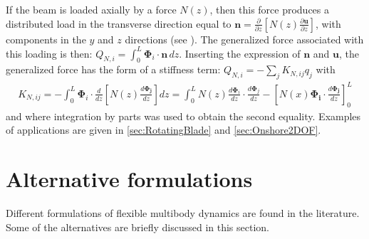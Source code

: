\documentclass[wes, manuscript]{copernicus}
\renewcommand{\v}[1]{\boldsymbol{#1}}
\begin{document}
If the beam is loaded axially by a force $N(z)$, then this force produces a distributed load in the transverse direction equal to $\v{n} = \frac{\partial}{\partial z}\left[N(z)\frac{\partial \v{u}}{\partial z}\right]$, with components in the $y$ and $z$ directions (see \cite{branlard:2019flex}).
The generalized force associated with this loading is then: $Q_{N,i}=\int_0^L \v{\Phi}_i\cdot \v{n}\, dz$. Inserting the expression of $\v{n}$ and $\v{u}$, the generalized force has the form of a stiffness term: $Q_{N,i} =-\sum_j K_{N,ij} q_j$ with
\begin{align}
   K_{N,ij} = -\int_0^L \v{\Phi}_i \cdot \frac{d}{d z} \left[N(z) \frac{d \v{\Phi_j}}{d z}\right] dz  
       = \int_0^L N(z) \frac{d \v{\Phi}_i }{dz}\cdot \frac{d \v{\Phi}_j }{dz} - \left[N(x) \v{\Phi_i}\cdot \frac{d\v{\Phi_j}}{dz}\right]_0^L
   \label{eq:StiffnessAxial}
\end{align}
and where integration by parts was used to obtain the second equality.
Examples of applications are given in \autoref{sec:RotatingBlade} and \autoref{sec:Onshore2DOF}.





\section{Alternative formulations}
\label{sec:AlternativeFormulations}
\label{sec:TaylorExpansion}

Different formulations of flexible multibody dynamics are found in the literature.
Some of the alternatives are briefly discussed in this section.
\end{document}
